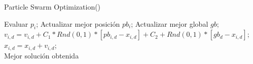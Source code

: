 \begin{algorithm}[!ht]
  \caption{Particle Swarm Optimization(\mbox{})}
  \label{pseu:pso}
  \begin{algorithmic}[1]
        \STATE Evaluar $ p_{i} $;
        \STATE Actualizar mejor posición $pb_{i}$;
        \STATE Actualizar mejor global $gb$;
      \ENDFOR
       \STATE $ v_{i,d} = v_{i,d} + C_{1} * Rnd(0,1) * [pb_{i,d} - x_{i,d}] + C_{2} + Rnd(0,1) * [gb_{d} - x_{i,d}] $;\\
            $ x_{i,d} = x_{i,d} + v_{i,d}$; \\
       \ENDFOR
      \ENDFOR
    \ENDWHILE
    \RETURN Mejor solución obtenida
  \end{algorithmic}
\end{algorithm}